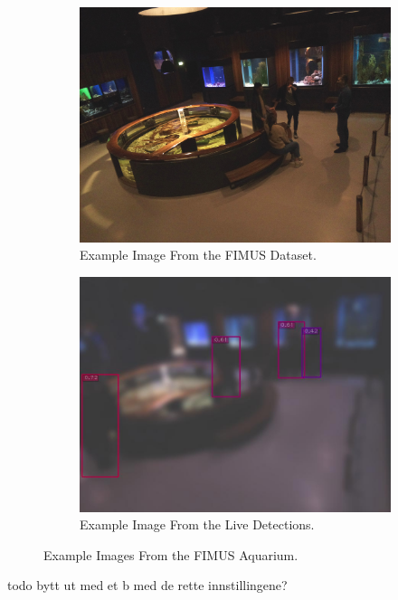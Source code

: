 \begin{figure}[H]
    \centering
    \begin{subfigure}{0.475\textwidth}
        \centering
		\includegraphics[width=\textwidth]{Images/DeviceImages/2nd-iteration/example.jpg}
        \caption{Example Image From the FIMUS Dataset.}
    \end{subfigure}
    \hfill
    \begin{subfigure}{0.475\textwidth}
        \centering
        \includegraphics[width=\textwidth]{Images/DeviceImages/live-example.jpg}
        \caption{Example Image From the Live Detections.}
    \end{subfigure}
	\caption{Example Images From the FIMUS Aquarium. }
	\label{fig:example_from_aquarium}
\end{figure}
todo bytt ut med et b med de rette innstillingene?

